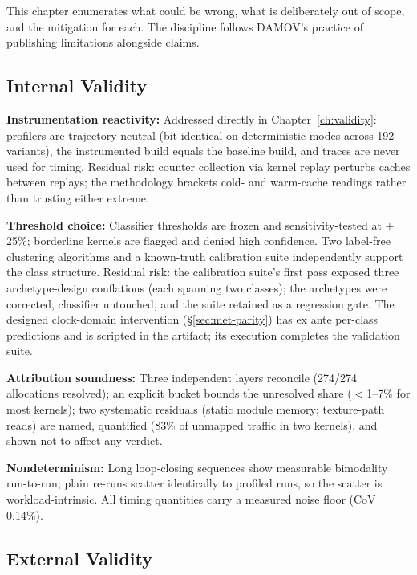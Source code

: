 \label{ch:threats}

This chapter enumerates what could be wrong, what is deliberately out of scope, and the mitigation for each. The discipline follows DAMOV's practice of publishing limitations alongside claims.

\subsection{Internal Validity}

\textbf{Instrumentation reactivity:} Addressed directly in Chapter~\ref{ch:validity}: profilers are trajectory-neutral (bit-identical on deterministic modes across 192 variants), the instrumented build equals the baseline build, and traces are never used for timing. Residual risk: counter collection via kernel replay perturbs caches between replays; the methodology brackets cold- and warm-cache readings rather than trusting either extreme.

\textbf{Threshold choice:} Classifier thresholds are frozen and sensitivity-tested at $\pm$25\%; borderline kernels are flagged and denied high confidence. Two label-free clustering algorithms and a known-truth calibration suite independently support the class structure. Residual risk: the calibration suite's first pass exposed three archetype-design conflations (each spanning two classes); the archetypes were corrected, classifier untouched, and the suite retained as a regression gate. The designed clock-domain intervention (\S\ref{sec:met-parity}) has ex ante per-class predictions and is scripted in the artifact; its execution completes the validation suite.

\textbf{Attribution soundness:} Three independent layers reconcile (274/274 allocations resolved); an explicit  bucket bounds the unresolved share ($<$1--7\% for most kernels); two systematic residuals (static module memory; texture-path reads) are named, quantified (83\% of unmapped traffic in two kernels), and shown not to affect any verdict.

\textbf{Nondeterminism:} Long loop-closing sequences show measurable bimodality run-to-run; plain re-runs scatter identically to profiled runs, so the scatter is workload-intrinsic. All timing quantities carry a measured noise floor (CoV 0.14\%).

\subsection{External Validity}

